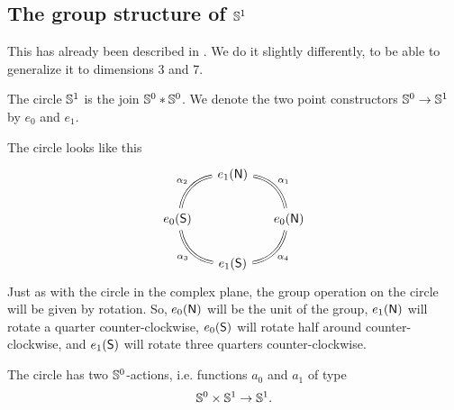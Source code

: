 \documentclass{article}
\newcommand{\join}[2]{{#1}*{#2}}
\begin{document}
\subsection{The group structure of $\mathbb{S}^1$}
This has already been described in \cite{TheBook}. We do it slightly differently,
to be able to generalize it to dimensions 3 and 7.

\begin{defn}
The circle $\mathbb{S}^1$ is the join $\join{\Sn^0}{\Sn^0}$. 
We denote the two point constructors $\mathbb{S}^0\to\mathbb{S}^1$ by $e_0$ and $e_1$. 
\end{defn}

The circle looks like this
\begin{equation*}
\begin{tikzcd}[column sep=small]
& e_1(\north) \arrow[dl,bend right=35,equals,swap,"\alpha_2"] \\
e_0(\south) \arrow[dr,bend right=35,equals,swap,"\alpha_3"] & & e_0(\north) \arrow[ul,bend right=35,equals,swap,"\alpha_1"] \\
& e_1(\south) \arrow[ur,bend right=35,equals,swap,"\alpha_4"] 
\end{tikzcd}
\end{equation*}
Just as with the circle in the complex plane, the group operation on the circle
will be given by rotation. So, $e_0(\mathsf{N})$ will be the unit of the group,
$e_1(\mathsf{N})$ will rotate a quarter counter-clockwise, $e_0(\mathsf{S})$ will rotate
half around counter-clockwise, and $e_1(\mathsf{S})$ will rotate three quarters
counter-clockwise.

\begin{defn}
The circle has two $\mathbb{S}^0$-actions, i.e. functions $a_0$ and $a_1$ of type
\begin{equation*}
\mathbb{S}^0\times\mathbb{S}^1\to\mathbb{S}^1.
\end{equation*}
\end{defn}
\end{document}
